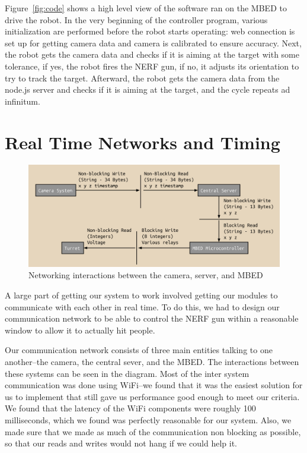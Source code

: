 \documentclass[journal]{IEEEtran}
\begin{document}
Figure~\ref{fig:code} shows a high level view of the software ran on the MBED to drive the robot. In the very beginning of the controller program, various initialization are performed before the robot starts operating: web connection is set up for getting camera data and camera is calibrated to ensure accuracy. Next, the robot gets the camera data and checks if it is aiming at the target with some tolerance, if yes, the robot fires the NERF gun, if no, it adjusts its orientation to try to track the target. Afterward, the robot gets the camera data from the node.js server and checks if it is aiming at the target, and the cycle repeats ad infinitum.

\section{Real Time Networks and Timing}

\begin{figure}[htbp]
    \centering
    \includegraphics[width=0.99\linewidth]{network.png}
    \caption{Networking interactions between the camera, server, and MBED}
    \label{fig:network}
\end{figure}

A large part of getting our system to work involved getting our modules to communicate with each other in real time. To do this, we had to design our communication network to be able to control the NERF gun within a reasonable window to allow it to actually hit people.

Our communication network consists of three main entities talking to one another--the camera, the central sever, and the MBED. The interactions between these systems can be seen in the diagram. Most of the inter system communication was done using WiFi--we found that it was the easiest solution for us to implement that still gave us performance good enough to meet our criteria. We found that the latency of the WiFi components were roughly 100 milliseconds, which we found was perfectly reasonable for our system. Also, we made sure that we made as much of the communication non blocking as possible, so that our reads and writes would not hang if we could help it.
\end{document}
